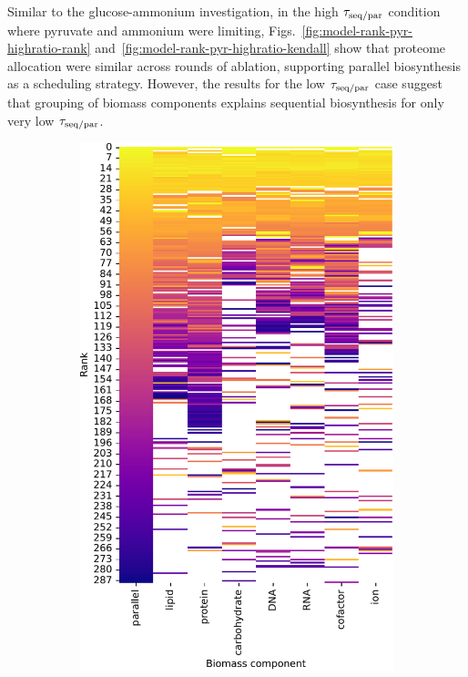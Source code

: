 Similar to the glucose-ammonium investigation, in the high $\tau_{\mathrm{seq}/\mathrm{par}}$ condition where pyruvate and ammonium were limiting, Figs.\ \ref{fig:model-rank-pyr-highratio-rank} and~\ref{fig:model-rank-pyr-highratio-kendall} show that proteome allocation were similar across rounds of ablation, supporting parallel biosynthesis as a scheduling strategy.
However, the results for the low $\tau_{\mathrm{seq}/\mathrm{par}}$ case suggest that grouping of biomass components explains sequential biosynthesis for only very low $\tau_{\mathrm{seq}/\mathrm{par}}$.

\begin{figure}
  \centering
  \begin{subfigure}[t]{0.45\textwidth}
  \centering
    \includegraphics[width=\linewidth]{CompareEnzUse_glc00p00_pyr03p73_amm00p90_1.pdf}

\end{subfigure}
\end{figure}
